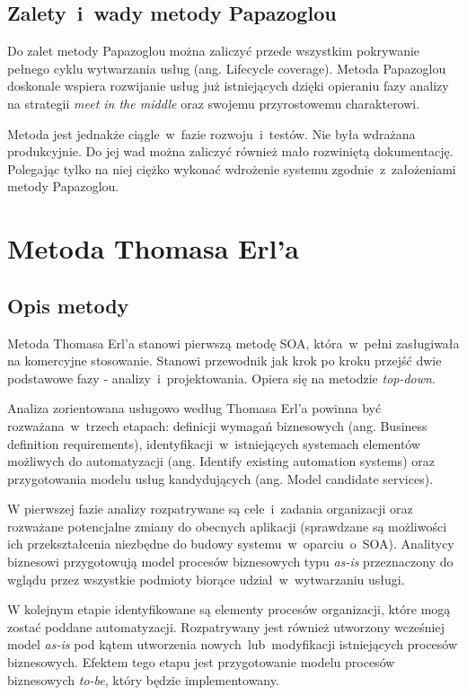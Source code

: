 \subsection{Zalety~i~wady metody Papazoglou}
Do zalet metody Papazoglou można zaliczyć przede wszystkim pokrywanie pełnego cyklu wytwarzania usług (ang. Lifecycle coverage). Metoda Papazoglou doskonale wspiera rozwijanie usług już istniejących dzięki opieraniu fazy analizy na strategii \emph{meet in the middle} oraz swojemu przyrostowemu charakterowi. 

Metoda jest jednakże ciągle~w~fazie rozwoju~i~testów. Nie była wdrażana produkcyjnie. Do jej wad można zaliczyć również mało rozwiniętą dokumentację. Polegając tylko na niej ciężko wykonać wdrożenie systemu zgodnie~z~założeniami metody Papazoglou. \cite{RamErvSOA}

\section{Metoda Thomasa Erl'a}

\subsection{Opis metody}
Metoda Thomasa Erl'a stanowi pierwszą metodę SOA, która~w~pełni zasługiwała na komercyjne stosowanie. Stanowi przewodnik jak krok po kroku przejść dwie podstawowe fazy - analizy~i~projektowania. Opiera się na metodzie \emph{top-down}.

Analiza zorientowana usługowo według Thomasa Erl'a powinna być rozważana~w~trzech etapach: definicji wymagań biznesowych (ang. Business definition requirements), identyfikacji~w~istniejących systemach elementów możliwych do automatyzacji (ang. Identify  existing 
automation systems) oraz przygotowania modelu usług kandydujących (ang. Model candidate services). 

W pierwszej fazie analizy rozpatrywane są cele~i~zadania organizacji oraz rozważane  potencjalne zmiany do obecnych aplikacji (sprawdzane są możliwości ich przekształcenia niezbędne do budowy systemu~w~oparciu~o~SOA). Analitycy biznesowi przygotowują model procesów biznesowych typu \emph{as-is} przeznaczony do wglądu przez wszystkie podmioty biorące udział~w~wytwarzaniu usługi. 

W kolejnym etapie identyfikowane są elementy procesów organizacji, które mogą zostać poddane automatyzacji. Rozpatrywany jest również utworzony wcześniej model \emph{as-is} pod kątem utworzenia nowych~lub~modyfikacji istniejących procesów biznesowych. Efektem tego etapu jest przygotowanie modelu procesów biznesowych \emph{to-be}, który będzie implementowany.

